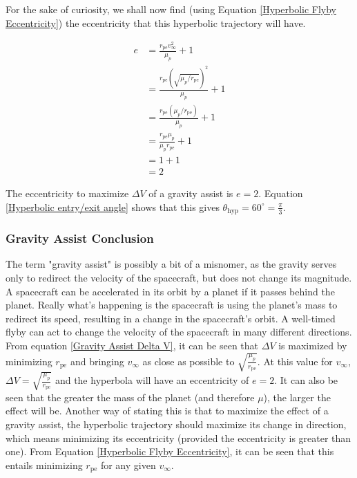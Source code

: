\documentclass[../main.tex]{subfiles}
\begin{document}
For the sake of curiosity, we shall now find (using Equation \eqref{Hyperbolic Flyby Eccentricity}) the eccentricity that this hyperbolic trajectory will have.

\begin{align*}
    e & = \frac{r_\text{pe}v_\infty^2}{\mu_p}+1                   \\
      & = \frac{r_\text{pe}(\sqrt{\mu_p/r_\text{pe}})^2}{\mu_p}+1 \\
      & = \frac{r_\text{pe}(\mu_p/r_\text{pe})}{\mu_p}+1          \\
      & = \frac{r_\text{pe}\mu_p}{\mu_p r_\text{pe}}+1            \\
      & = 1+1                                                     \\
      & = 2
\end{align*}

The eccentricity to maximize $\Delta V$ of a gravity assist is $e=2$. Equation \eqref{Hyperbolic entry/exit angle} shows that this gives $\theta_\text{hyp}=60^{\circ}=\frac{\pi}{3}$.

\subsubsection{Gravity Assist Conclusion}

The term "gravity assist" is possibly a bit of a misnomer, as the gravity serves only to redirect the velocity of the spacecraft, but does not change its magnitude. A spacecraft can be accelerated in its orbit by a planet if it passes behind the planet. Really what's happening is the spacecraft is using the planet's mass to redirect its speed, resulting in a change in the spacecraft's orbit. A well-timed flyby can act to change the velocity of the spacecraft in many different directions. From equation \eqref{Gravity Assist Delta V}, it can be seen that $\Delta V$ is maximized by minimizing $r_\text{pe}$ and bringing $v_\infty$ as close as possible to $\sqrt{\frac{\mu_p}{r_\text{pe}}}$. At this value for $v_\infty$, $\Delta V = \sqrt{\frac{\mu_p}{r_\text{pe}}}$ and the hyperbola will have an eccentricity of $e=2$. It can also be seen that the greater the mass of the planet (and therefore $\mu$), the larger the effect will be. Another way of stating this is that to maximize the effect of a gravity assist, the hyperbolic trajectory should maximize its change in direction, which means minimizing its eccentricity (provided the eccentricity is greater than one). From Equation \eqref{Hyperbolic Flyby Eccentricity}, it can be seen that this entails minimizing $r_\text{pe}$ for any given $v_\infty$.
\end{document}
